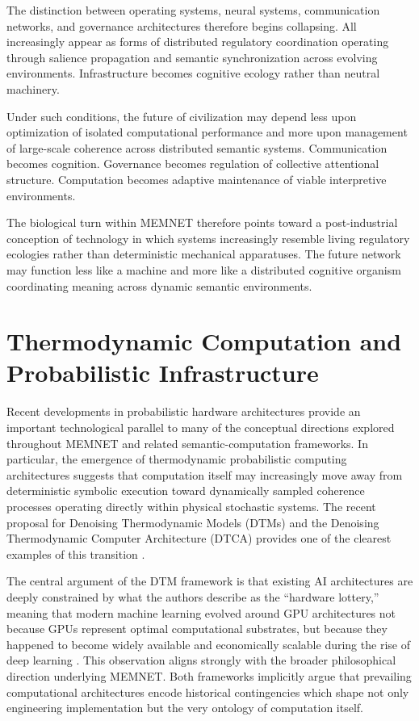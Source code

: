 \documentclass[11pt,a4paper]{article}
\begin{document}
The distinction between operating systems, neural systems, communication networks, and governance architectures therefore begins collapsing. All increasingly appear as forms of distributed regulatory coordination operating through salience propagation and semantic synchronization across evolving environments. Infrastructure becomes cognitive ecology rather than neutral machinery.

Under such conditions, the future of civilization may depend less upon optimization of isolated computational performance and more upon management of large-scale coherence across distributed semantic systems. Communication becomes cognition. Governance becomes regulation of collective attentional structure. Computation becomes adaptive maintenance of viable interpretive environments.

The biological turn within MEMNET therefore points toward a post-industrial conception of technology in which systems increasingly resemble living regulatory ecologies rather than deterministic mechanical apparatuses. The future network may function less like a machine and more like a distributed cognitive organism coordinating meaning across dynamic semantic environments.

\section{Thermodynamic Computation and Probabilistic Infrastructure}

Recent developments in probabilistic hardware architectures provide an important technological parallel to many of the conceptual directions explored throughout MEMNET and related semantic-computation frameworks. In particular, the emergence of thermodynamic probabilistic computing architectures suggests that computation itself may increasingly move away from deterministic symbolic execution toward dynamically sampled coherence processes operating directly within physical stochastic systems. The recent proposal for Denoising Thermodynamic Models (DTMs) and the Denoising Thermodynamic Computer Architecture (DTCA) provides one of the clearest examples of this transition \cite{jelincic2025}.

The central argument of the DTM framework is that existing AI architectures are deeply constrained by what the authors describe as the ``hardware lottery,'' meaning that modern machine learning evolved around GPU architectures not because GPUs represent optimal computational substrates, but because they happened to become widely available and economically scalable during the rise of deep learning \cite{jelincic2025}. This observation aligns strongly with the broader philosophical direction underlying MEMNET. Both frameworks implicitly argue that prevailing computational architectures encode historical contingencies which shape not only engineering implementation but the very ontology of computation itself.
\end{document}
